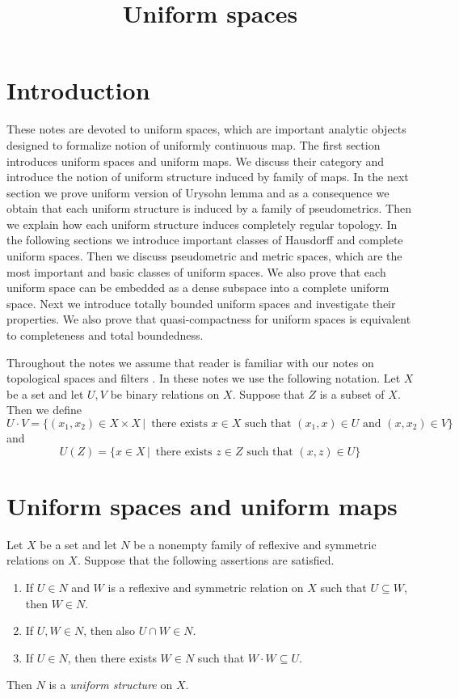 \documentclass[10pt]{amsart}
\begin{document}
\title{Uniform spaces}
\date{}
\maketitle

\section{Introduction}
\noindent
These notes are devoted to uniform spaces, which are important analytic objects designed to formalize notion of uniformly continuous map. The first section introduces uniform spaces and uniform maps. We discuss their category and introduce the notion of uniform structure induced by family of maps. In the next section we prove uniform version of Urysohn lemma and as a consequence we obtain that each uniform structure is induced by a family of pseudometrics. Then we explain how each uniform structure induces completely regular topology. In the following sections we introduce important classes of Hausdorff and complete uniform spaces. Then we discuss pseudometric and metric spaces, which are the most important and basic classes of uniform spaces. We also prove that each uniform space can be embedded as a dense subspace into a complete uniform space. Next we introduce totally bounded uniform spaces and investigate their properties. We also prove that quasi-compactness for uniform spaces is equivalent to completeness and total boundedness.

Throughout the notes we assume that reader is familiar with our notes on topological spaces \cite{Topological_spaces} and filters \cite{Filters_in_topology}. In these notes we use the following notation. Let $X$ be a set and let $U, V$ be binary relations on $X$. Suppose that $Z$ is a subset of $X$. Then we define
$$U \cdot V = \big\{(x_1,x_2) \in X\times X\,\big|\,\mbox{ there exists }x\in X\mbox{ such that }(x_1, x)\in U\mbox{ and }(x,x_2)\in V\big\}$$
and
$$U(Z) = \big\{x \in X\,\big|\,\mbox{ there exists }z\in Z\mbox{ such that }(x, z)\in U\big\}$$


\section{Uniform spaces and uniform maps}

\begin{definition}
	Let $X$ be a set and let $N$ be a nonempty family of reflexive and symmetric relations on $X$. Suppose that the following assertions are satisfied.
	\begin{enumerate}[label=\textbf{(\arabic*)}, leftmargin=3.0em]
		\item If $U \in N$ and $W$ is a reflexive and symmetric relation on $X$ such that $U \subseteq W$, then $W \in N$.
		\item If $U,W \in N$, then also $U\cap W \in N$.
		\item If $U \in N$, then there exists $W \in N$ such that $W\cdot W \subseteq U$.
	\end{enumerate}
	Then $N$ is a \textit{uniform structure} on $X$.
\end{definition}
\end{document}
